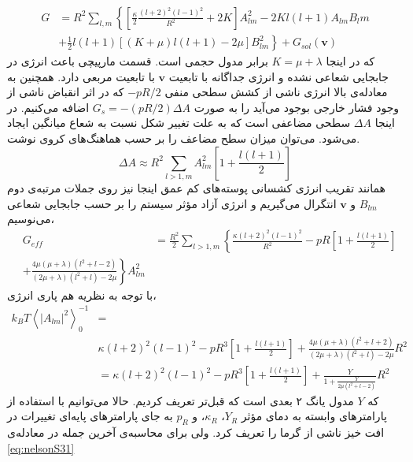 \begin{equation}
\begin{aligned}
G&=R^2\sum_{l,m}\left\{\left[\frac{\kappa}{2}\frac{(l+2)^2(l-1)^2}{R^2}+2K\right]A_{lm}^2-2Kl(l+1)A_{lm}B_lm\right.\\
&\left.+\frac{1}{2}l(l+1)[(K+\mu)l(l+1)-2\mu]B_{lm}^2\right\}+G_{sol}(\boldsymbol v)
\label{eq:nelsonS28}
\end{aligned}
\end{equation} 
که در اینجا $K=\mu+\lambda$
برابر مدول حجمی‌ 
است. قسمت مارپیچی باعث انرژی در جابجایی شعاعی نشده و انرژی جداگانه با تابعیت $\boldsymbol v$ با تابعیت مربعی دارد. همچنین به معادله‌ی بالا انرژی ناشی از کشش سطحی منفی $-pR/2$ که در اثر انقباض ناشی از وجود فشار خارجی بوجود می‌آید را به صورت $G_s=-(pR/2)\Delta A$ اضافه می‌کنیم. در اینجا $\Delta A$ سطحی مضاعفی است که به علت تغییر شکل نسبت به شعاع میانگین ایجاد می‌شود. می‌توان میزان سطح مضاعف را بر حسب هماهنگ‌های کروی نوشت.
\cite{milnersafranPRA1987}
\begin{equation}
\Delta A\approx R^2\sum_{l>1,m}A_{lm}^2\left[1+\frac{l(l+1)}{2}\right]
\label{eq:nelsonS29}
\end{equation} 
همانند تقریب انرژی کشسانی پوسته‌های کم عمق اینجا نیز روی جملات مرتبه‌ی دوم $B_{lm}$ و $\boldsymbol v$ انتگرال می‌گیریم و انرژی آزاد مؤثر سیستم را بر حسب جابجایی شعاعی می‌نوسیم،
\begin{equation}
\begin{aligned}
&G_{eff}&=\frac{R^2}{2}\sum_{l>1,m}\left\{\frac{\kappa(l+2)^2(l-1)^2}{R^2}-pR\left[1+\frac{l(l+1)}{2}\right]\right.\\
&\left.+\frac{4\mu(\mu+\lambda)(l^2+l-2)}{(2\mu+\lambda)(l^2+l)-2\mu}\right\}A_{lm}^2
\label{eq:nelsonS30}
\end{aligned}
\end{equation} 
 با توجه به نظریه هم پاری انرژی،
\begin{equation}
\begin{aligned}
k_BT\left\langle|A_{lm}|^2\right\rangle_0^{-1}&=\\
&\kappa(l+2)^2(l-1)^2-pR^3\left[1+\frac{l(l+1)}{2}\right]+\frac{4\mu(\mu+\lambda)(l^2+l+2)}{(2\mu+\lambda)(l^2+l)-2\mu}R^2\\
&=\kappa(l+2)^2(l-1)^2-pR^3\left[1+\frac{l(l+1)}{2}\right]+\frac{Y}{1+\frac{Y}{2\mu(l^2+l-2)}}R^2
\label{eq:nelsonS31}
\end{aligned}
\end{equation} 
که $Y$ مدول یانگ ۲ بعدی است که قبل‌تر تعریف کردیم. حالا می‌توانیم با استفاده از پارامتر‌های وابسته به دمای مؤثر $Y_R$، $\kappa_R$، و $p_R$ به جای پارامتر‌های پایه‌ای تغییرات در افت خیز ناشی از گرما را تعریف کرد. ولی برای محاسبه‌ی آخرین جمله در معادله‌ی \ref{eq:nelsonS31} 
